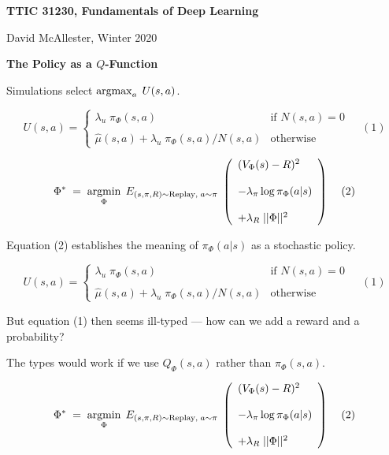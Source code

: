 




{\Huge

  \centerline{\bf TTIC 31230, Fundamentals of Deep Learning}
  \bigskip
  \centerline{David McAllester, Winter 2020}

  \vfill
  \centerline{\bf The Policy as a $Q$-Function}
  \vfill
  \vfill


Simulations select $\operatorname*{argmax}_a\;U(s,a)$.

{\huge
$$U(s,a) =  \left\{\begin{array}{ll}\lambda_u \; \pi_\Phi(s,a) &\mbox{if $N(s,a) = 0$} \\ \\ \hat{\mu}(s,a) + \lambda_u\; \pi_\Phi(s,a)/N(s,a) & \mbox{otherwise} \end{array}\right. \;\;\;\;(1)$$

\vfill
$$\Phi^*\; = \;\operatorname*{argmin}_\Phi \;E_{(s,\pi,R) \sim \mathrm{Replay},\;a \sim \pi}\;\left(\begin{array}{l} (V_\Phi(s) - R)^2 \\ \\ - \lambda_\pi\log \pi_\Phi(a|s) \\ \\ + \lambda_R\;||\Phi||^2\end{array}\right)\;\;\;\;(2)$$
}
\vfill
Equation (2) establishes the meaning of $\pi_\Phi(a|s)$ as a stochastic policy.


\bigskip
$$U(s,a) =  \left\{\begin{array}{ll}\lambda_u \; \pi_\Phi(s,a) &\mbox{if $N(s,a) = 0$} \\ \\ \hat{\mu}(s,a) + \lambda_u\; \pi_\Phi(s,a)/N(s,a) & \mbox{otherwise} \end{array}\right. \;\;\;\;(1)$$

\bigskip
But equation (1) then seems ill-typed --- how can we add a reward and a probability?

\bigskip
The types would work if we use $Q_\Phi(s,a)$ rather than $\pi_\Phi(s,a)$.



\bigskip
$$\Phi^*\; = \;\operatorname*{argmin}_\Phi \;E_{(s,\pi,R) \sim \mathrm{Replay},\;a \sim \pi}\;\left(\begin{array}{l} (V_\Phi(s) - R)^2 \\ \\ - \lambda_\pi\log \pi_\Phi(a|s) \\ \\ + \lambda_R\;||\Phi||^2\end{array}\right)\;\;\;\;(2)$$

}
